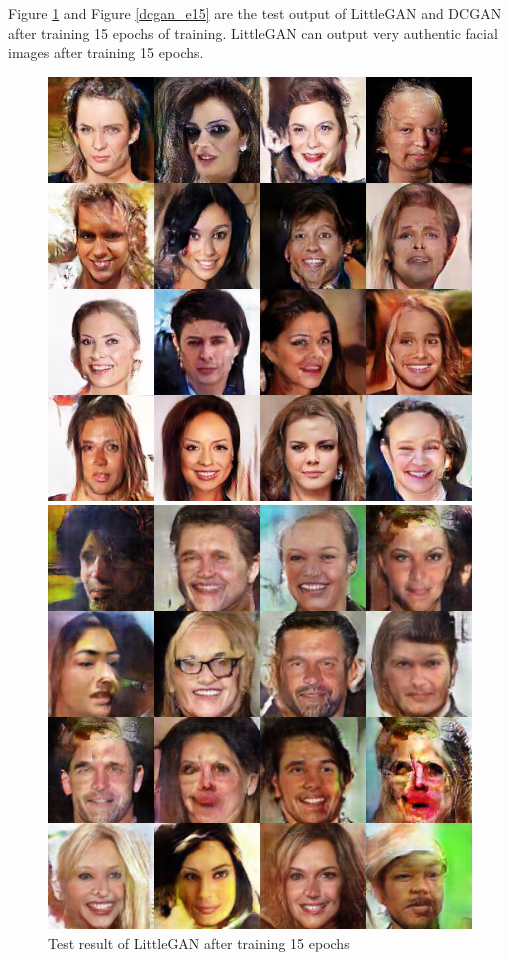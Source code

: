 Figure \ref{littlegan_e15} and Figure \ref{dcgan_e15} are the test output of LittleGAN and DCGAN after training 15 epochs of training.
LittleGAN can output very authentic facial images after training 15 epochs.

    \begin{figure}
        \begin{minipage}[t]{0.48\linewidth}
            \centering
            \includegraphics[width=\textwidth]{figures/result_littlegan_e15.png}
            \caption{Test result of LittleGAN after training 15 epochs}
            \label{littlegan_e15}
        \end{minipage}
            \hfill
        \begin{minipage}[t]{0.48\linewidth}
            \centering
            \includegraphics[width=\textwidth]{figures/result_dcgan_e15.png}

\end{minipage}
\end{figure}
